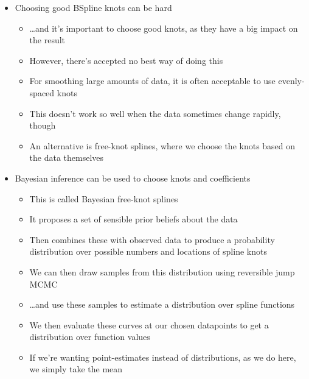 \documentclass[11pt]{article}
\begin{document}
\begin{itemize}
\item Choosing good BSpline knots can be hard
\begin{itemize}
\item \ldots{}and it's important to choose good knots, as they have a big impact on the result
\item However, there's accepted no best way of doing this
\item For smoothing large amounts of data, it is often acceptable to use evenly-spaced knots
\item This doesn't work so well when the data sometimes change rapidly, though
\item An alternative is free-knot splines, where we choose the knots based on the data themselves
\end{itemize}

\item Bayesian inference can be used to choose knots and coefficients
\begin{itemize}
\item This is called Bayesian free-knot splines
\item It proposes a set of sensible prior beliefs about the data
\item Then combines these with observed data to produce a probability distribution over possible numbers and locations of spline knots
\item We can then draw samples from this distribution using reversible jump MCMC
\item \ldots{}and use these samples to estimate a distribution over spline functions
\item We then evaluate these curves at our chosen datapoints to get a distribution over function values
\item If we're wanting point-estimates instead of distributions, as we do here, we simply take the mean
\end{itemize}
\end{itemize}
\end{document}
